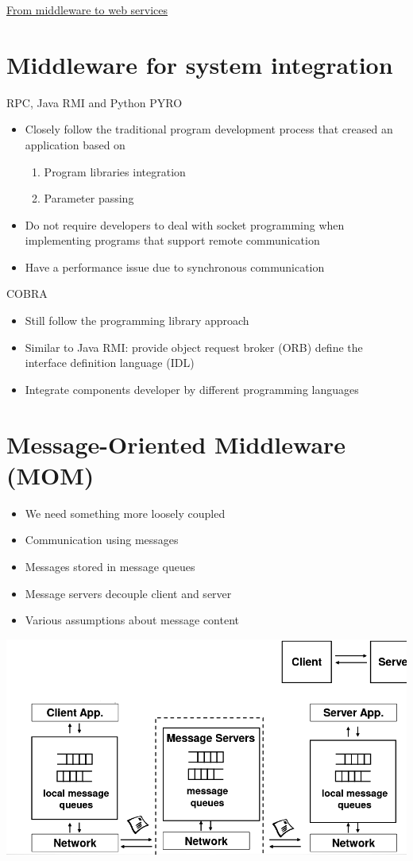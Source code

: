 \documentclass{article}[18pt]
\begin{document}
\begin{center}
\underline{\huge From middleware to web services}
\end{center}
\section{Middleware for system integration}
RPC, Java RMI and Python PYRO
\begin{itemize}
	\item Closely follow the traditional program development process that creased an application based on 
	\begin{enumerate}
		\item Program libraries integration
		\item Parameter passing
	\end{enumerate}
	\item Do not require developers to deal with socket programming when implementing programs that support remote communication
	\item Have a performance issue due to synchronous communication
\end{itemize}
COBRA
\begin{itemize}
	\item Still follow the programming library approach
	\item Similar to Java RMI: provide object request broker (ORB) define the interface definition language (IDL)
	\item Integrate components developer by different programming languages
\end{itemize}
\section{Message-Oriented Middleware (MOM)}
\begin{itemize}
	\item We need something more loosely coupled
	\item Communication using messages
	\item Messages stored in message queues
	\item Message servers decouple client and server
	\item Various assumptions about message content
	
\end{itemize}

\begin{center}
	\includegraphics[scale=0.7]{MOM}
\end{center}
\end{document}
